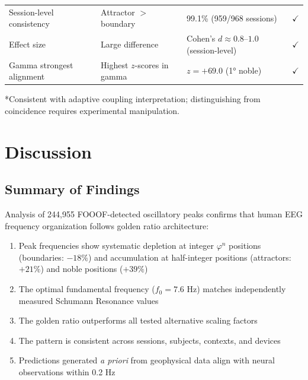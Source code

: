 \documentclass[11pt,a4paper]{article}
\newcommand{\phisym}{\varphi}
\newcommand{\fzero}{f_0}
\begin{document}
\begin{table}[H]
\begin{tabular}{@{}p{5cm}p{4cm}p{4cm}c@{}}
Session-level consistency & Attractor $>$ boundary & 99.1\% (959/968 sessions) & $\checkmark$ \\
Effect size & Large difference & Cohen's $d \approx 0.8$--$1.0$ (session-level) & $\checkmark$ \\
Gamma strongest alignment & Highest $z$-scores in gamma & $z = +69.0$ (1° noble) & $\checkmark$ \\
\bottomrule
\end{tabular}
\begin{flushleft}
\small
*Consistent with adaptive coupling interpretation; distinguishing from coincidence requires experimental manipulation.
\end{flushleft}
\end{table}

\section{Discussion}

\subsection{Summary of Findings}

Analysis of 244,955 FOOOF-detected oscillatory peaks confirms that human EEG frequency organization follows golden ratio architecture:

\begin{enumerate}
    \item Peak frequencies show systematic depletion at integer $\phisym^n$ positions (boundaries: $-18\%$) and accumulation at half-integer positions (attractors: $+21\%$) and noble positions ($+39\%$)
    
    \item The optimal fundamental frequency ($\fzero = 7.6$ Hz) matches independently measured Schumann Resonance values
    
    \item The golden ratio outperforms all tested alternative scaling factors
    
    \item The pattern is consistent across sessions, subjects, contexts, and devices
    
    \item Predictions generated \textit{a priori} from geophysical data align with neural observations within 0.2 Hz
\end{enumerate}
\end{document}
